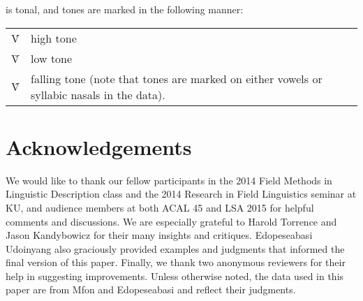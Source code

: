 \documentclass[output=paper,
modfonts
]{langscibook}
\begin{document}
 \bigskip
\noindent
  is tonal, and tones are marked in the following manner: 
 
\bigskip 
\noindent
\begin{tabularx}{\textwidth}{lX}
 \'{V} & high tone\\
 \`{V} & low tone\\
 \^{V} & falling tone (note that tones are marked on either vowels or syllabic nasals in the data).
 \end{tabularx}

\section*{Acknowledgements}

We would like to thank our fellow participants in the 2014 Field Methods in Linguistic Description class and the 2014 Research in Field Linguistics seminar at KU, and audience members at both ACAL 45 and LSA 2015 for helpful comments and discussions. We are especially grateful to Harold Torrence and Jason Kandybowicz for their many insights and critiques. Edopeseabasi Udoinyang also graciously provided examples and judgments that informed the final version of this paper. Finally, we thank two anonymous reviewers for their help in suggesting improvements. Unless otherwise noted, the data used in this paper are from Mfon and Edopeseabasi and reflect their judgments.

{\sloppy
\printbibliography[heading=subbibliography,notkeyword=this]
}
\end{document}
